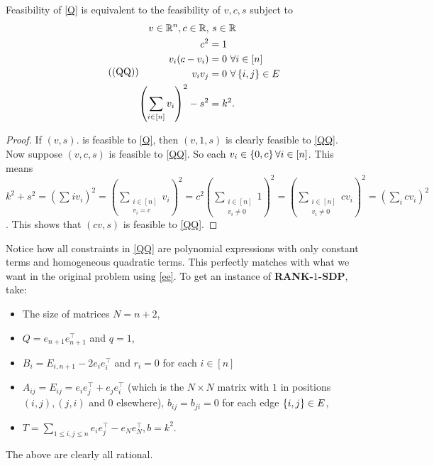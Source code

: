 \begin{cl}
Feasibility of \ref{Q} is equivalent to the feasibility of $v,c,s$ subject to 
\begin{equation}\tag{(QQ)}\label{QQ}\begin{aligned}
v\in\mathbb{R}^{n}, c\in\mathbb{R}, &~s\in \mathbb{R}\\
c^{2}&=1\\
v_{i}(c-v_{i}) &= 0~\forall i\in [n]\\
v_{i}v_{j} &= 0 ~\forall \left\{i,j\right\}\in E\\
\left(\sum_{i\in[n]} v_{i}\right)^{2}-s^{2}&=k^{2}.
\end{aligned}\end{equation}
\end{cl}
\begin{proof}
If $(v,s)$. is feasible to \ref{Q}, then $(v,1,s)$ is clearly feasible to \ref{QQ}.\\
Now suppose $(v,c,s)$ is feasible to \ref{QQ}. So each $v_{i}\in \left\{0,c\right\}\forall i\in[n]$. This means $k^{2}+s^{2} = \left(\sum_{}{i} v_{i}\right)^{2} = \left(\sum_{\substack{i\in[n]\\v_{i}= c}} v_{i}\right)^{2} = c^{2}\left(\sum_{\substack{i\in[n]\\v_{i}\ne 0}} 1\right)^{2} = \left(\sum_{\substack{i\in[n]\\v_{i}\ne 0}} cv_{i}\right)^{2} = \left(\sum_{i} cv_{i}\right)^{2}$. This shows that $(cv,s)$ is feasible to \ref{QQ}.
\end{proof}

Notice how all constraints in \ref{QQ} are polynomial expressions with only constant terms and homogeneous quadratic terms. This perfectly matches with what we want in the original problem using \cref{ee}. To get an instance of \textbf{RANK-$1$-SDP}, take: \begin{itemize}
\item The size of matrices $N = n+2$,
\item $Q = e_{n+1}e_{n+1}^{\top}$ and $q=1$,
\item $B_{i} = E_{i,n+1} - 2 e_{i}e_{i}^{\top}$ and $r_{i}=0$ for each $i\in[n]$
\item $A_{ij} = E_{ij} = e_{i}e_{j}^{\top} + e_{j}e_{i}^{\top}$ (which is the $N\times N$ matrix with $1$ in positions $(i,j),(j,i)$ and $0$ elsewhere), $b_{ij}=b_{ji}=0$ for each edge $\left\{i,j\right\}\in E$,
\item $T = \sum\limits_{1\le i,j\le n}e_{i}e_{j}^{\top} - e_{N}e_{N}^{\top}, b = k^{2}$.
\end{itemize}The above are clearly all rational.

